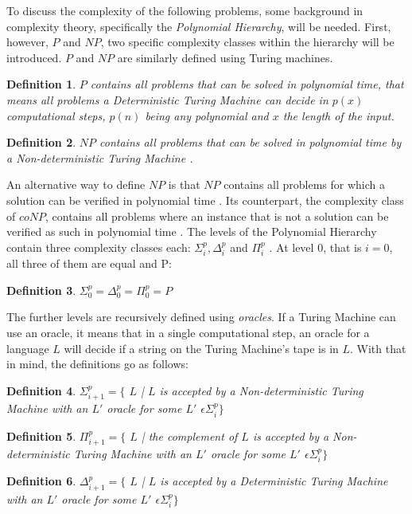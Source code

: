 \documentclass[12pt,a4paper]{article}
\newtheorem{definition}{Definition}
\begin{document}
To discuss the complexity of the following problems, some background in complexity theory, specifically the \textit{Polynomial Hierarchy}, will be needed. First, however, $P$ and $NP$, two specific complexity classes within the hierarchy will be introduced.
\newline
$P$ and $NP$ are similarly defined using Turing machines. 
\begin{definition}
$P$ contains all problems that can be solved in polynomial time, that means all problems a Deterministic Turing Machine can decide in $p(x)$ computational steps, $p(n)$ being any polynomial and $x$ the length of the input.
\end{definition} 
\begin{definition}
$NP$ contains all problems that can be solved in polynomial time by a Non-deterministic Turing Machine \citep{Davis1983}. 
\end{definition} 
An alternative way to define $NP$ is that $NP$ contains all problems for which a solution can be verified in polynomial time \citep[p. 59]{Goldreich}. Its counterpart, the complexity class of $coNP$, contains all problems where an instance that is not a solution can be verified as such in polynomial time \citep[p. 154-155]{Goldreich}. 
\newline
The levels of the Polynomial Hierarchy contain three complexity classes each: $\Sigma^p_i, \Delta^p_i$ and $\Pi^p_i$ \citep{Meyer1972}. At level 0, that is $i = 0$, all three of them are equal and P: 
\begin{definition}
	$\Sigma^p_0 = \Delta^p_0 = \Pi^p_0 = P $ \citep{Stockmeyer1976}
\end{definition}  
The further levels are recursively defined using \textit{oracles}. If a Turing Machine can use an oracle, it means that in a single computational step, an oracle for a language $L$ will decide if a string on the Turing Machine's tape is in $L$. With that in mind, the definitions go as follows:
\begin{definition}
	$\Sigma^p_{i+1} = \{$ $L$ | $L$ is accepted by a Non-deterministic Turing Machine with an $L'$ oracle for some $L'$ $\epsilon \Sigma^p_i\}$
\end{definition}
\begin{definition}
	$\Pi^p_{i+1} = \{$ $L$ | the complement of $L$ is accepted by a Non-deterministic Turing Machine with an $L'$ oracle for some $L'$ $\epsilon \Sigma^p_i\}$
\end{definition}
\begin{definition}
	$\Delta^p_{i+1} = \{$ $L$ | $L$ is accepted by a Deterministic Turing Machine with an $L'$ oracle for some $L'$ $\epsilon \Sigma^p_i\}$
\end{definition}
\end{document}
